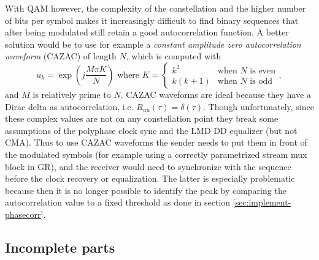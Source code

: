 With QAM however, the complexity of the constellation and the higher number of bits per symbol makes it increasingly difficult to find binary sequences that after being modulated still retain a good autocorrelation function. A better solution would be to use for example a \emph{constant amplitude zero autocorrelation waveform} (CAZAC) of length \(N\), which is computed with
\begin{equation}
	u_k = \exp\left(j\frac{M\pi K}{N}\right) \text{ where }
	K = \begin{cases}
		k^2 & \text{when } N \text{ is even} \\
		k(k+1) & \text{when } N \text{ is odd}
	\end{cases},
\end{equation}
and \(M\) is relatively prime to \(N\). CAZAC waveforms are ideal because they have a Dirac delta as autocorrelation\cite{Chu1972}, i.e. \(R_{uu}(\tau) = \delta(\tau)\). Though unfortunately, since these complex values are not on any constellation point they break some assumptions of the polyphase clock sync and the LMD DD equalizer (but not CMA). Thus to use CAZAC waveforms the sender needs to put them in front of the modulated symbols (for example using a correctly parametrized stream mux block in GR), and the receiver would need to synchronize with the sequence before the clock recovery or equalization. The latter is especially problematic because then it is no longer possible to identify the peak by comparing the autocorrelation value to a fixed threshold as done in section \ref{sec:implement-phasecorr}.

\subsection{Incomplete parts}


